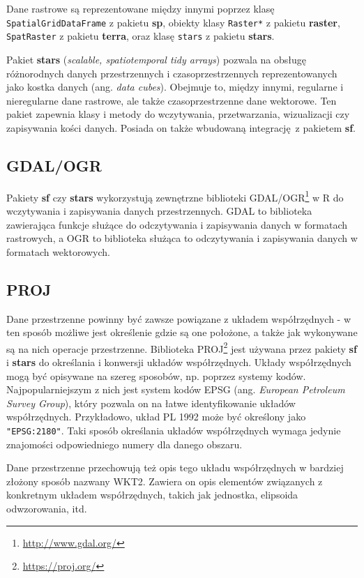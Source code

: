 \documentclass[
  paper=6in:9in,pagesize=pdftex,headinclude=on,footinclude=on,10pt]{scrbook}
\renewcommand{\href}[2]{#2 (\url{#1})}
\renewcommand{\href}[2]{#2\footnote{\url{#1}}}
\begin{document}
Dane rastrowe są reprezentowane między innymi poprzez klasę \texttt{SpatialGridDataFrame} z pakietu \textbf{sp}, obiekty klasy \texttt{Raster*} z pakietu \textbf{raster}, \texttt{SpatRaster} z pakietu \textbf{terra}, oraz klasę \texttt{stars} z pakietu \textbf{stars}.

Pakiet \textbf{stars} (\emph{scalable, spatiotemporal tidy arrays}) pozwala na obsługę różnorodnych danych przestrzennych i czasoprzestrzennych reprezentowanych jako kostka danych (ang. \emph{data cubes}).
Obejmuje to, między innymi, regularne i nieregularne dane rastrowe, ale także czasoprzestrzenne dane wektorowe.
Ten pakiet zapewnia klasy i metody do wczytywania, przetwarzania, wizualizacji czy zapisywania kości danych.
Posiada on także wbudowaną integrację~z pakietem \textbf{sf}.

\subsection{GDAL/OGR}\label{gdalogr}

Pakiety \textbf{sf} czy \textbf{stars} wykorzystują zewnętrzne biblioteki \href{http://www.gdal.org/}{GDAL/OGR} w R do wczytywania i zapisywania danych przestrzennych.
GDAL to biblioteka zawierająca funkcje służące do odczytywania i zapisywania danych w formatach rastrowych, a OGR to biblioteka służąca to odczytywania i zapisywania danych w formatach wektorowych.

\subsection{PROJ}\label{proj}

Dane przestrzenne powinny być zawsze powiązane z układem współrzędnych - w ten sposób możliwe jest określenie gdzie są one położone, a także jak wykonywane są na nich operacje przestrzenne.
Biblioteka \href{https://proj.org/}{PROJ} jest używana przez pakiety \textbf{sf} i \textbf{stars} do określania i konwersji układów współrzędnych.
Układy współrzędnych mogą być opisywane na szereg sposobów, np. poprzez systemy kodów.
Najpopularniejszym z nich jest system kodów EPSG (ang. \emph{European Petroleum Survey Group}), który pozwala on na łatwe identyfikowanie układów współrzędnych.
Przykładowo, układ PL 1992 może być określony jako \texttt{"EPSG:2180"}.
Taki sposób określania układów współrzędnych wymaga jedynie znajomości odpowiedniego numery dla danego obszaru.

Dane przestrzenne przechowują też opis tego układu współrzędnych w bardziej złożony sposób nazwany WKT2.
Zawiera on opis elementów związanych z konkretnym układem współrzędnych, takich jak jednostka, elipsoida odwzorowania, itd.
\end{document}
